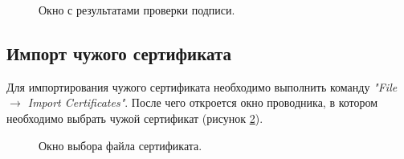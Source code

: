 \documentclass[10pt,a4paper]{report}
\begin{document}
\begin{figure}[h]
	\caption{Окно с результатами проверки подписи.}
	\label{ris:step36}
\end{figure}

\subsection{Импорт чужого сертификата}
Для импортирования чужого сертификата необходимо выполнить команду \textit{"File \begin{math}\to\end{math} Import Certificates"}. После чего откроется окно проводника, в котором необходимо выбрать чужой сертификат  (рисунок \ref{ris:step41}).

\begin{figure}[h]
	\caption{Окно выбора файла сертификата.}
	\label{ris:step41}
\end{figure}
\end{document}
